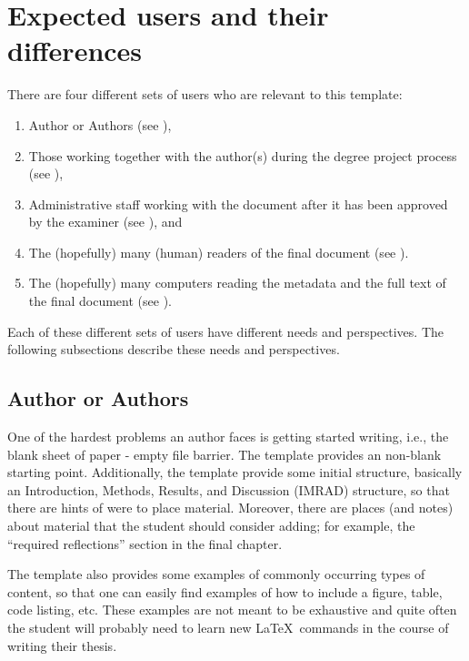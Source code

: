 \documentclass{article}
\begin{document}
\section{Expected users and their differences}
\label{sec:expectedUsers}
There are four different sets of users who are relevant to this template:
\begin{enumerate}[leftmargin=*,label=\textbf{Users \arabic*}, ref={Users \arabic*}]
    \item \label{users:authors} Author or Authors (see ),
    \item \label{users:others} Those working together with the author(s) during the degree project process (see ),
    \item \label{users:admins} Administrative staff working with the document after it has been approved by the examiner (see ), and
    \item \label{users:readers} The (hopefully) many (human) readers of the final document (see ).
    \item \label{users:searchEngines} The (hopefully) many computers reading the metadata and the full text of the final document (see ).
\end{enumerate}

Each of these different sets of users have different needs and perspectives. The following subsections describe these needs and perspectives.

\subsection{Author or Authors}
\label{sec:authors}
One of the hardest problems an author faces is getting started writing, i.e., the blank sheet of paper - empty file barrier. The template provides an non-blank starting point. Additionally, the template provide some initial structure, basically an  Introduction, Methods, Results, and Discussion (IMRAD) structure, so that there are hints of were to place material. Moreover, there are places (and notes) about material that the student should consider adding; for example, the ``required reflections'' section in the final chapter.

The template also provides some examples of commonly occurring types of content, so that one can easily find examples of how to include a figure, table, code listing, etc. These examples are not meant to be exhaustive and quite often the student will probably need to learn new \LaTeX\ commands in the course of writing their thesis.
\end{document}
